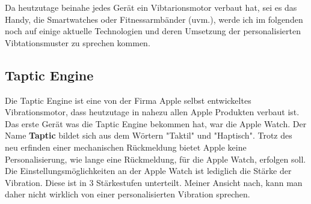 
Da heutzutage beinahe jedes Ger{\"a}t ein Vibtarionsmotor verbaut hat, sei es das Handy, die Smartwatches oder Fitnessarmb{\"a}nder (uvm.), werde ich im folgenden noch auf einige aktuelle Technologien und deren Umsetzung der personalisierten Vibtationsmuster zu sprechen kommen. 

\subsection{Taptic Engine}
\label{ch:Grundlagen:sec:RelatedWork:subsec:TapticEngine}

Die Taptic Engine ist eine von der Firma Apple selbst entwickeltes Vibrationsmotor, dass heutzutage in nahezu allen Apple Produkten verbaut ist. Das erste Ger{\"a}t was die Taptic Engine bekommen hat, war die Apple Watch. Der Name \textbf{Taptic} bildet sich aus dem W{\"o}rtern "Taktil" und "Haptisch". 
Trotz des neu erfinden einer mechanischen R{\"u}ckmeldung bietet Apple keine Personalisierung, wie lange eine R{\"u}ckmeldung, f{\"u}r die Apple Watch, erfolgen soll. Die Einstellungsm{\"o}glichkeiten an der Apple Watch ist lediglich die St{\"a}rke der Vibration. Diese ist in 3 St{\"a}rkestufen unterteilt. Meiner Ansicht nach, kann man daher nicht wirklich von einer personalisierten Vibration sprechen. 

